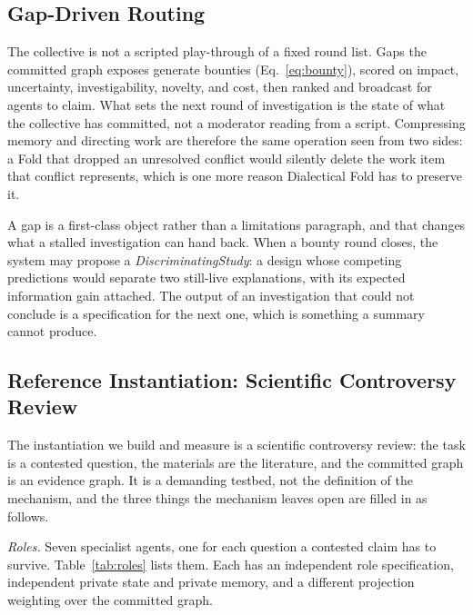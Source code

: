 \subsection{Gap-Driven Routing}
\label{sec:routing}

The collective is not a scripted play-through of a fixed round list. Gaps the
committed graph exposes generate bounties (Eq.~\eqref{eq:bounty}), scored on
impact, uncertainty, investigability, novelty, and cost, then ranked and
broadcast for agents to claim. What sets the next round of investigation is the
state of what the collective has committed, not a moderator reading from a
script. Compressing memory and directing work are therefore the same operation
seen from two sides: a Fold that dropped an unresolved conflict would silently
delete the work item that conflict represents, which is one more reason
Dialectical Fold has to preserve it.

A gap is a first-class object rather than a limitations paragraph, and that
changes what a stalled investigation can hand back. When a bounty round closes,
the system may propose a \emph{DiscriminatingStudy}: a design whose competing
predictions would separate two still-live explanations, with its expected
information gain attached. The output of an investigation that could not
conclude is a specification for the next one, which is something a summary
cannot produce.

\subsection{Reference Instantiation: Scientific Controversy Review}
\label{sec:instantiation}

The instantiation we build and measure is a scientific controversy review: the
task is a contested question, the materials are the literature, and the
committed graph is an evidence graph. It is a demanding testbed, not the
definition of the mechanism, and the three things the mechanism leaves open are
filled in as follows.

\emph{Roles.} Seven specialist agents, one for each question a contested claim
has to survive. Table~\ref{tab:roles} lists them. Each has an independent role
specification, independent private state and private memory, and a different
projection weighting over the committed graph.

